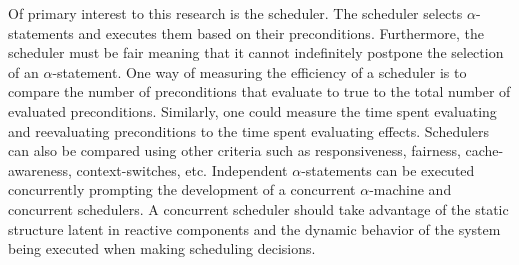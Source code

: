 
Of primary interest to this research is the scheduler.
The scheduler selects $\alpha$-statements and executes them based on their preconditions.
Furthermore, the scheduler must be fair meaning that it cannot indefinitely postpone the selection of an $\alpha$-statement.
One way of measuring the efficiency of a scheduler is to compare the number of preconditions that evaluate to true to the total number of evaluated preconditions.
Similarly, one could measure the time spent evaluating and reevaluating preconditions to the time spent evaluating effects.
Schedulers can also be compared using other criteria such as responsiveness, fairness, cache-awareness, context-switches, etc.
Independent $\alpha$-statements can be executed concurrently prompting the development of a concurrent $\alpha$-machine and concurrent schedulers.
A concurrent scheduler should take advantage of the static structure latent in reactive components and the dynamic behavior of the system being executed when making scheduling decisions.

